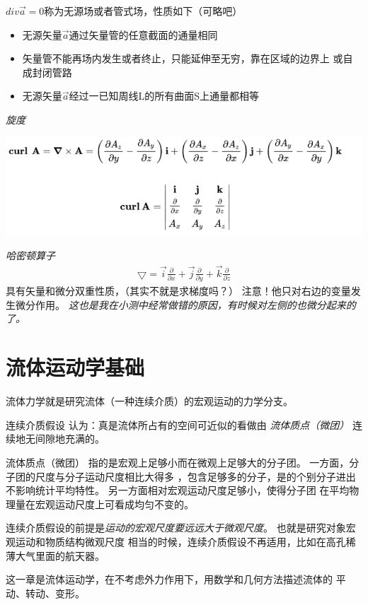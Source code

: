 \documentclass[UTF8,12pt]{article}
\begin{document}
$div \vec a = 0$称为无源场或者管式场，性质如下（可略吧）
\begin{itemize}
    \item 无源矢量$\vec a$通过矢量管的任意截面的通量相同
    \item 矢量管不能再场内发生或者终止，只能延伸至无穷，靠在区域的边界上
    或自成封闭管路
    \item 无源矢量$\vec a$经过一已知周线L的所有曲面S上通量都相等
\end{itemize}

\emph{旋度}
\begin{center}
    \includegraphics[width=.8\linewidth]{img/xuandu.png}
\end{center}

\emph{哈密顿算子}
\begin{align*}
    \bigtriangledown = \vec i \frac{\partial}{\partial x} 
                        + \vec j \frac{\partial}{\partial y}
                        + \vec k \frac{\partial}{\partial z}
\end{align*}
具有矢量和微分双重性质，（其实不就是求梯度吗？）
注意！他只对右边的变量发生微分作用。
\emph{这也是我在小测中经常做错的原因，有时候对左侧的也微分起来的了。}

\newpage
\section{流体运动学基础}
流体力学就是研究流体（一种连续介质）的宏观运动的力学分支。

{\color{cyan} 连续介质假设}
认为：真是流体所占有的空间可近似的看做由
\emph{流体质点（微团）}
连续地无间隙地充满的。

{\color{cyan} 流体质点（微团）}
指的是宏观上足够小而在微观上足够大的分子团。
    一方面，分子团的尺度与分子运动尺度相比大得多
，包含足够多的分子，是的个别分子进出不影响统计平均特性。
    另一方面相对宏观运动尺度足够小，使得分子团
在平均物理量在宏观运动尺度上可看成均匀不变的。

连续介质假设的前提是\emph{运动的宏观尺度要远远大于微观尺度}。
也就是研究对象宏观运动和物质结构微观尺度 
相当的时候，连续介质假设不再适用，比如在高孔稀薄大气里面的航天器。

这一章是流体运动学，在不考虑外力作用下，用数学和几何方法描述流体的
{\color{cyan} 平动、转动、变形}。
\end{document}
